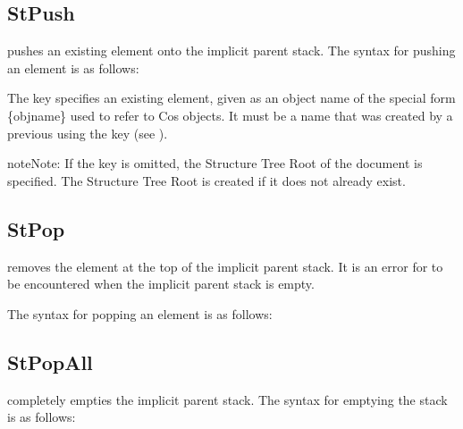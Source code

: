 \documentclass[letterpaper,12pt,english,openany,oneside]{sphinxmanual}
\begin{document}
\subsection{StPush}
\label{\detokenize{pdfmark_Logical:stpush}}
 pushes an existing element onto the implicit parent stack. The syntax for pushing an element is as follows:

\begin{sphinxVerbatim}[commandchars=\\\{\}]
 \PYG{p}{[} 

     
\end{sphinxVerbatim}

The  key specifies an existing element, given as an object name of the special form \{objname\} used to refer to Cos objects. It must be a name that was created by a previous  using the  key (see ).

\begin{sphinxadmonition}{note}{Note:}
If the  key is omitted, the Structure Tree Root of the document is specified. The Structure Tree Root is created if it does not already exist.
\end{sphinxadmonition}


\subsection{StPop}
\label{\detokenize{pdfmark_Logical:stpop}}
 removes the element at the top of the implicit parent stack. It is an error for  to be encountered when the implicit parent stack is empty.

The syntax for popping an element is as follows:

\begin{sphinxVerbatim}[commandchars=\\\{\}]
\PYG{p}{[}  
\end{sphinxVerbatim}


\subsection{StPopAll}
\label{\detokenize{pdfmark_Logical:stpopall}}
 completely empties the implicit parent stack. The syntax for emptying the stack is as follows:
\end{document}
